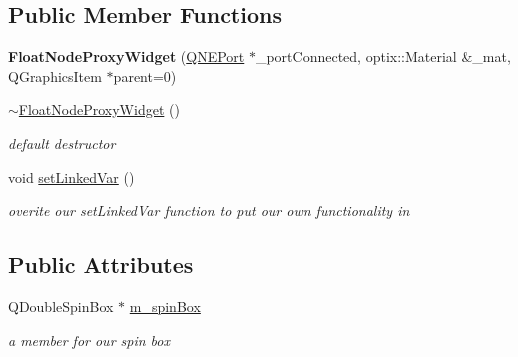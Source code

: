 \subsection*{Public Member Functions}
\begin{DoxyCompactItemize}
\item 
\hypertarget{class_float_node_proxy_widget_af7146e6a3a5c285d37531d9ce33ba19c}{{\bfseries Float\-Node\-Proxy\-Widget} (\hyperlink{class_q_n_e_port}{Q\-N\-E\-Port} $\ast$\-\_\-port\-Connected, optix\-::\-Material \&\-\_\-mat, Q\-Graphics\-Item $\ast$parent=0)}\label{class_float_node_proxy_widget_af7146e6a3a5c285d37531d9ce33ba19c}

\item 
\hypertarget{class_float_node_proxy_widget_a32f81dfe40973640f0febe2617d38cf5}{\hyperlink{class_float_node_proxy_widget_a32f81dfe40973640f0febe2617d38cf5}{$\sim$\-Float\-Node\-Proxy\-Widget} ()}\label{class_float_node_proxy_widget_a32f81dfe40973640f0febe2617d38cf5}

\begin{DoxyCompactList}\small\item\em default destructor \end{DoxyCompactList}\item 
\hypertarget{class_float_node_proxy_widget_aba0f4178a27b9040de1b84ee3ffd71f4}{void \hyperlink{class_float_node_proxy_widget_aba0f4178a27b9040de1b84ee3ffd71f4}{set\-Linked\-Var} ()}\label{class_float_node_proxy_widget_aba0f4178a27b9040de1b84ee3ffd71f4}

\begin{DoxyCompactList}\small\item\em overite our set\-Linked\-Var function to put our own functionality in \end{DoxyCompactList}\end{DoxyCompactItemize}
\subsection*{Public Attributes}
\begin{DoxyCompactItemize}
\item 
\hypertarget{class_float_node_proxy_widget_a9ce5875eba5a01b81af74d2e30d117c3}{Q\-Double\-Spin\-Box $\ast$ \hyperlink{class_float_node_proxy_widget_a9ce5875eba5a01b81af74d2e30d117c3}{m\-\_\-spin\-Box}}\label{class_float_node_proxy_widget_a9ce5875eba5a01b81af74d2e30d117c3}

\begin{DoxyCompactList}\small\item\em a member for our spin box \end{DoxyCompactList}\end{DoxyCompactItemize}

